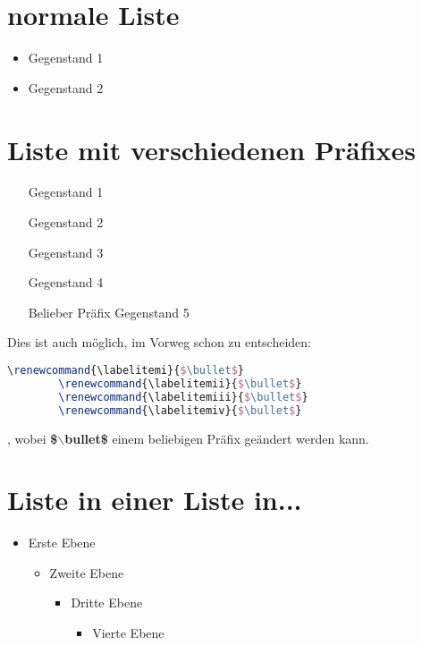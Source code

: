 \documentclass{scrarticle}
\begin{document}
	\section{normale Liste}
	\begin{itemize}
		\item Gegenstand 1
		\item Gegenstand 2
	\end{itemize}

	\section{Liste mit verschiedenen Präfixes}
	\begin{itemize}
		\item[\labelitemi] Gegenstand 1
		\item[\labelitemii] Gegenstand 2
		\item[\labelitemiii] Gegenstand 3
		\item[\labelitemiv] Gegenstand 4
		\item[Belieber Präfix] Gegenstand 5
	\end{itemize}
	Dies ist auch möglich, im Vorweg schon zu entscheiden:
	\begin{lstlisting}[language=TeX]
		\renewcommand{\labelitemi}{$\bullet$}
		\renewcommand{\labelitemii}{$\bullet$}
		\renewcommand{\labelitemiii}{$\bullet$}
		\renewcommand{\labelitemiv}{$\bullet$}
	\end{lstlisting}
	, wobei \textbf{\$$\backslash$bullet\$} einem beliebigen Präfix geändert werden kann.
	
	\section{Liste in einer Liste in...}
	\begin{itemize}
		\item Erste Ebene
		 \begin{itemize}
			\item Zweite Ebene
			 \begin{itemize}
				\item Dritte Ebene
				 \begin{itemize}
					\item Vierte Ebene
				\end{itemize}
			\end{itemize}
		\end{itemize}
	\end{itemize}
\end{document}
